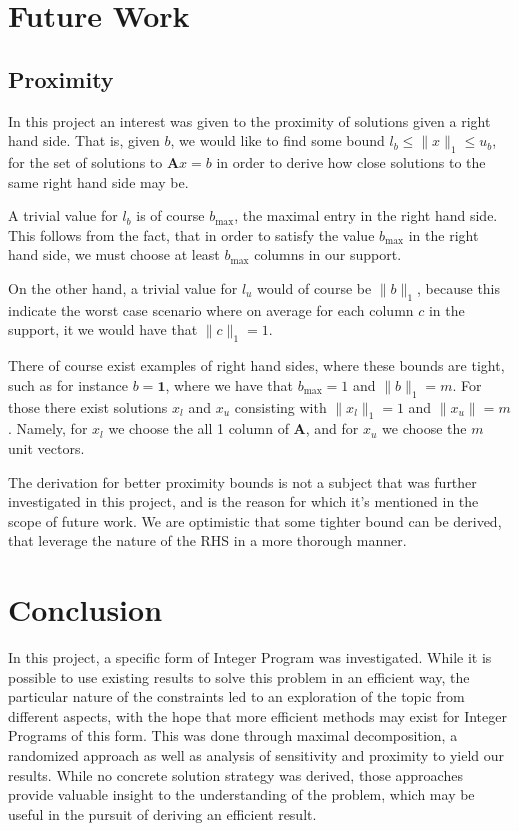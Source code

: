 \documentclass{article}
\newcommand\norm[1]{\lVert#1\rVert}
\begin{document}
\section{Future Work}
\subsection{Proximity}
In this project an interest was given to the proximity of solutions given a right hand side.
That is, given $b$, we would like to find some bound $l_b \leq \norm{x}_1 \leq u_b$, for the set of solutions to $\mathbf{A}x = b$ in order to derive how close solutions to the same right hand side may be. 

A trivial value for $l_{b}$ is of course $b_{\max}$, the maximal entry in the right hand side. This follows from the fact, that in order to satisfy the value $b_{\max}$ in the right hand side, we must choose at least $b_{\max}$ columns in our support. 

On the other hand, a trivial value for $ l_{u} $ would of course be $ \norm{b}_1 $, because this indicate the worst case scenario where on average for each column $ c $ in the support, it we would have that $ \norm{c}_1 = 1 $.

There of course exist examples of right hand sides, where these bounds are tight, such as for instance $ b = \mathbf{1} $, where we have that $ b_{\max} = 1 $ and $ \norm{b}_1 = m $. For those there exist solutions $ x_l $ and $ x_u $ consisting with $ \norm{x_l}_1 = 1 $ and $\norm{x_u} = m $. Namely, for $ x_l  $ we choose the all 1 column of $ \mathbf{A} $, and for $ x_u $ we choose the $ m $ unit vectors. 

The derivation for better proximity bounds is not a subject that was further investigated in this project, and is the reason for which it's mentioned in the scope of future work. We are optimistic that some tighter bound can be derived, that leverage the nature of the RHS in a more thorough manner. 

\section{Conclusion}
In this project, a specific form of Integer Program was investigated. While it is possible to  use existing results to solve this problem in an efficient way, the particular nature of the constraints led to an exploration of the topic from different aspects, with the hope that more efficient methods may exist for Integer Programs of this form. This was done through maximal decomposition, a randomized approach as well as analysis of sensitivity and proximity to yield our results. While no concrete solution strategy was derived, those approaches provide valuable insight to the understanding of the problem, which may be useful in the pursuit of deriving an efficient result. 
\end{document}
